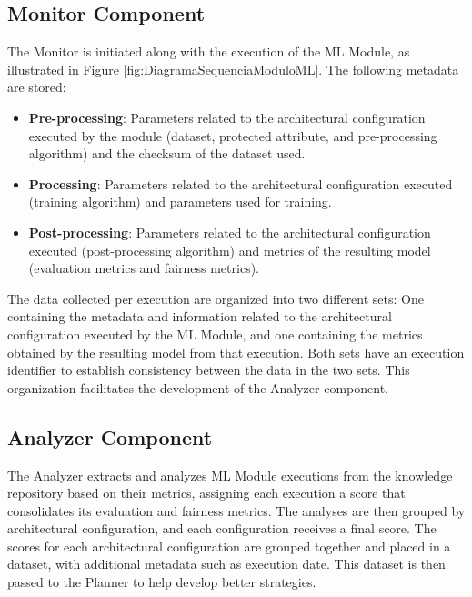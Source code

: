 \documentclass[sigconf]{acmart}
\begin{document}
\subsection{Monitor Component}

The Monitor is initiated along with the execution of the ML Module, as illustrated in Figure \ref{fig:DiagramaSequenciaModuloML}. The following metadata are stored:

\begin{itemize}
\item \textbf{Pre-processing}: Parameters related to the architectural configuration executed by the module (dataset, protected attribute, and pre-processing algorithm) and the checksum of the dataset used.
\item \textbf{Processing}: Parameters related to the architectural configuration executed (training algorithm) and parameters used for training.
\item \textbf{Post-processing}: Parameters related to the architectural configuration executed (post-processing algorithm) and metrics of the resulting model (evaluation metrics and fairness metrics).
\end{itemize}

The data collected per execution are organized into two different sets: One containing the metadata and information related to the architectural configuration executed by the ML Module, and one containing the metrics obtained by the resulting model from that execution. Both sets have an execution identifier to establish consistency between the data in the two sets. This organization facilitates the development of the Analyzer component.

\subsection{Analyzer Component}
\label{sec:AnalyzerComponent}

The Analyzer extracts and analyzes ML Module executions from the knowledge repository based on their metrics, assigning each execution a score that consolidates its evaluation and fairness metrics. The analyses are then grouped by architectural configuration, and each configuration receives a final score. The scores for each architectural configuration are grouped together and placed in a dataset, with additional metadata such as execution date. This dataset is then passed to the Planner to help develop better strategies.
\end{document}
